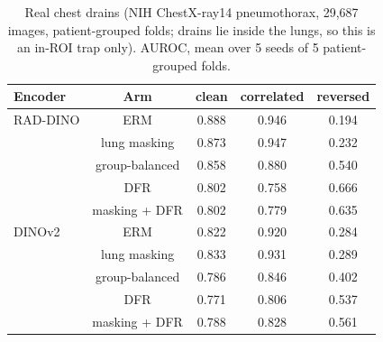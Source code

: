 \begin{table}[H]\centering\scriptsize
\caption{Real chest drains (NIH ChestX-ray14 pneumothorax, 29,687 images, patient-grouped folds; drains lie inside the lungs, so this is an in-ROI trap only). AUROC, mean over 5 seeds of 5 patient-grouped folds.}\label{tab:drains}
\begin{tabular}{lcccc}\toprule
Encoder & Arm & clean & correlated & reversed \\\midrule
RAD-DINO & ERM & 0.888 & 0.946 & 0.194 \\
 & lung masking & 0.873 & 0.947 & 0.232 \\
 & group-balanced & 0.858 & 0.880 & 0.540 \\
 & DFR & 0.802 & 0.758 & 0.666 \\
 & masking + DFR & 0.802 & 0.779 & 0.635 \\
DINOv2 & ERM & 0.822 & 0.920 & 0.284 \\
 & lung masking & 0.833 & 0.931 & 0.289 \\
 & group-balanced & 0.786 & 0.846 & 0.402 \\
 & DFR & 0.771 & 0.806 & 0.537 \\
 & masking + DFR & 0.788 & 0.828 & 0.561 \\
\bottomrule\end{tabular}
\end{table}
